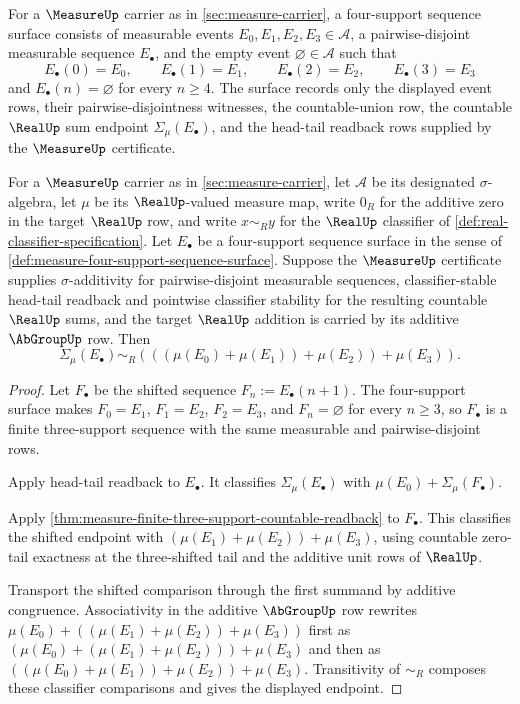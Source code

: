 \begin{definition}
\label{def:measure-four-support-sequence-surface}
For a $\MeasureUp$ carrier as in \autoref{sec:measure-carrier}, a
four-support sequence surface consists of measurable events
$E_0,E_1,E_2,E_3\in\mathcal{A}$, a pairwise-disjoint measurable sequence
$E_\bullet$, and the empty event $\varnothing\in\mathcal{A}$ such that
$$
E_\bullet(0)=E_0,\qquad
E_\bullet(1)=E_1,\qquad
E_\bullet(2)=E_2,\qquad
E_\bullet(3)=E_3
$$
and $E_\bullet(n)=\varnothing$ for every $n\geq4$. The surface records only
the displayed event rows, their pairwise-disjointness witnesses, the
countable-union row, the countable $\RealUp$ sum endpoint
$\Sigma_\mu(E_\bullet)$, and the head-tail readback rows supplied by the
$\MeasureUp$ certificate.
\end{definition}

\begin{theorem}
\label{thm:measure-four-support-countable-readback}
For a $\MeasureUp$ carrier as in \autoref{sec:measure-carrier}, let
$\mathcal{A}$ be its designated $\sigma$-algebra, let $\mu$ be its
$\RealUp$-valued measure map, write $0_R$ for the additive zero in the target
$\RealUp$ row, and write $x\sim_R y$ for the $\RealUp$ classifier of
\autoref{def:real-classifier-specification}. Let $E_\bullet$ be a
four-support sequence surface in the sense of
\autoref{def:measure-four-support-sequence-surface}. Suppose the $\MeasureUp$
certificate supplies $\sigma$-additivity for pairwise-disjoint measurable
sequences, classifier-stable head-tail readback and pointwise classifier
stability for the resulting countable $\RealUp$ sums, and the target
$\RealUp$ addition is carried by its additive $\AbGroupUp$ row. Then
$$
\Sigma_\mu(E_\bullet)\sim_R(((\mu(E_0)+\mu(E_1))+\mu(E_2))+\mu(E_3)).
$$
\end{theorem}
\begin{proof}
Let $F_\bullet$ be the shifted sequence $F_n:=E_\bullet(n+1)$. The
four-support surface makes $F_0=E_1$, $F_1=E_2$, $F_2=E_3$, and
$F_n=\varnothing$ for every $n\geq3$, so $F_\bullet$ is a finite
three-support sequence with the same measurable and pairwise-disjoint rows.

Apply head-tail readback to $E_\bullet$. It classifies
$\Sigma_\mu(E_\bullet)$ with $\mu(E_0)+\Sigma_\mu(F_\bullet)$.

Apply \autoref{thm:measure-finite-three-support-countable-readback} to
$F_\bullet$. This classifies the shifted endpoint with
$(\mu(E_1)+\mu(E_2))+\mu(E_3)$, using countable zero-tail exactness at the
three-shifted tail and the additive unit rows of $\RealUp$.

Transport the shifted comparison through the first summand by additive
congruence. Associativity in the additive $\AbGroupUp$ row rewrites
$\mu(E_0)+((\mu(E_1)+\mu(E_2))+\mu(E_3))$ first as
$(\mu(E_0)+(\mu(E_1)+\mu(E_2)))+\mu(E_3)$ and then as
$((\mu(E_0)+\mu(E_1))+\mu(E_2))+\mu(E_3)$. Transitivity of $\sim_R$ composes
these classifier comparisons and gives the displayed endpoint.
\end{proof}

